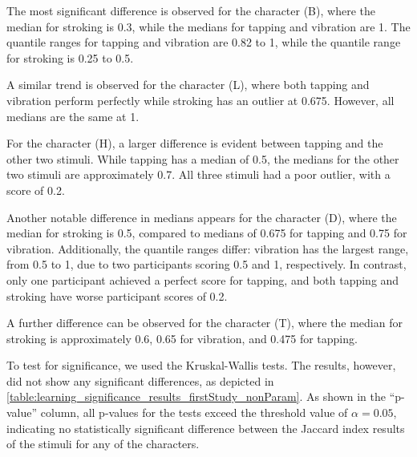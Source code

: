 The most significant difference is observed for the character (B), where the median for stroking is 0.3, while the medians for tapping and vibration are 1. The quantile ranges for tapping and vibration are 0.82 to 1, while the quantile range for stroking is 0.25 to 0.5.

A similar trend is observed for the character (L), where both tapping and vibration perform perfectly while stroking has an outlier at 0.675. However, all medians are the same at 1.

For the character (H), a larger difference is evident between tapping and the other two stimuli. While tapping has a median of 0.5, the medians for the other two stimuli are approximately 0.7. All three stimuli had a poor outlier, with a score of 0.2.

Another notable difference in medians appears for the character (D), where the median for stroking is 0.5, compared to medians of 0.675 for tapping and 0.75 for vibration. Additionally, the quantile ranges differ: vibration has the largest range, from 0.5 to 1, due to two participants scoring 0.5 and 1, respectively. In contrast, only one participant achieved a perfect score for tapping, and both tapping and stroking have worse participant scores of 0.2.

A further difference can be observed for the character (T), where the median for stroking is approximately 0.6, 0.65 for vibration, and 0.475 for tapping.

To test for significance, we used the Kruskal-Wallis tests. The results, however, did not show any significant differences, as depicted in \autoref{table:learning_significance_results_firstStudy_nonParam}. 
As shown in the \enquote{p-value} column, all p-values for the tests exceed the threshold value of $\alpha = 0.05$, indicating no statistically significant difference between the Jaccard index results of the stimuli for any of the characters.


